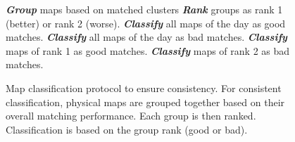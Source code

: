 \begin{figure}[!b]
        \begin{algorithmic}[1]    
                \State \textit{\textbf{Group}} maps based on matched clusters
                \State \textit{\textbf{Rank}} groups as rank 1 (better) or rank 2 (worse).      
                \Statex 
                \State \textit{\textbf{Classify}} all maps of the day as good matches.
                \EndIf
                \Statex
                \State \textit{\textbf{Classify}} all maps of the day as bad matches.
                \EndIf 
                \Statex
                \State \textit{\textbf{Classify}} maps of rank 1 as good matches.
                \State \textit{\textbf{Classify}} maps of rank 2 as bad matches.
                \EndIf      
        \end{algorithmic}
        \caption{
        Map classification protocol to ensure consistency.
        For consistent classification, physical maps are grouped together
        based on their overall matching performance.
        Each group is then ranked.
        Classification is based on the group rank (good or bad).}
        \label{fig:classAlg}
\end{figure}
